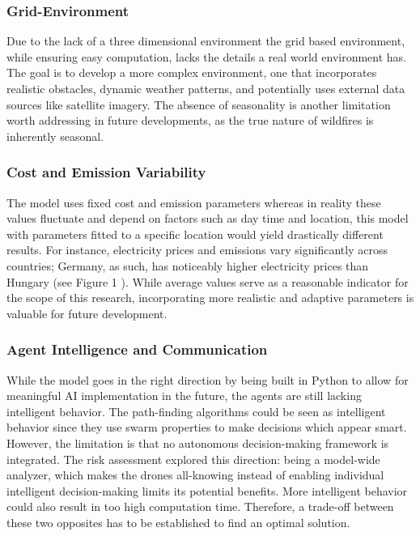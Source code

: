 \documentclass[11pt, a4paper]{article}
\begin{document}
\subsubsection{Grid-Environment}

Due to the lack of a three dimensional environment the grid based environment, while ensuring easy computation, lacks the details a real world environment has. The goal is to develop a more complex environment, one that incorporates realistic obstacles, dynamic weather patterns, and potentially uses external data sources like satellite imagery. The absence of seasonality is another limitation worth addressing in future developments, as the true nature of wildfires is inherently seasonal.

\subsubsection{Cost and Emission Variability}
The model uses fixed cost and emission parameters whereas in reality these values fluctuate and depend on factors such as day time and location, this model with parameters fitted to a specific location would yield drastically different results. For instance, electricity prices and emissions vary significantly across countries; Germany, as such, has noticeably higher electricity prices than Hungary (see Figure 1 \cite{ElectricityPriceStatistics}). While average values serve as a reasonable indicator for the scope of this research, incorporating more realistic and adaptive parameters is valuable for future development.

\subsubsection{Agent Intelligence and Communication}

While the model goes in the right direction by being built in Python to allow for meaningful AI implementation in the future, the agents are still lacking intelligent behavior. The path-finding algorithms could be seen as intelligent behavior since they use swarm properties to make decisions which appear smart. However, the limitation is that no autonomous decision-making framework is integrated. The risk assessment explored this direction: being a model-wide analyzer, which makes the drones all-knowing instead of enabling individual intelligent decision-making limits its potential benefits. More intelligent behavior could also result in too high computation time. Therefore, a trade-off between these two opposites has to be established to find an optimal solution.
\end{document}
